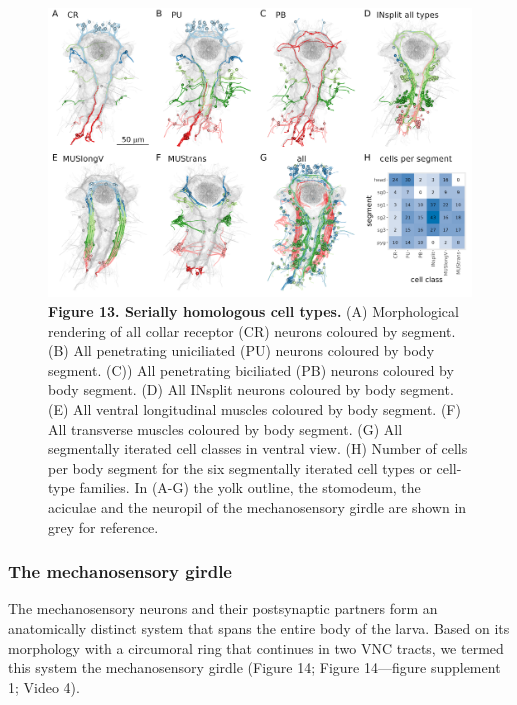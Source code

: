 \documentclass[
  11pt,
]{article}
\begin{document}
\begin{figure}[H]

{\centering \includegraphics[width=1\textwidth,height=\textheight]{Figures/Figure13.png}

}

\caption{\textbf{Figure 13. Serially homologous cell types.} (A)
Morphological rendering of all collar receptor (CR) neurons coloured by
segment. (B) All penetrating uniciliated (PU) neurons coloured by body
segment. (C)) All penetrating biciliated (PB) neurons coloured by body
segment. (D) All INsplit neurons coloured by body segment. (E) All
ventral longitudinal muscles coloured by body segment. (F) All
transverse muscles coloured by body segment. (G) All segmentally
iterated cell classes in ventral view. (H) Number of cells per body
segment for the six segmentally iterated cell types or cell-type
families. In (A-G) the yolk outline, the stomodeum, the aciculae and the
neuropil of the mechanosensory girdle are shown in grey for reference.}

\end{figure}%

\subsubsection{The mechanosensory
girdle}\label{the-mechanosensory-girdle}

The mechanosensory neurons and their postsynaptic partners form an
anatomically distinct system that spans the entire body of the larva.
Based on its morphology with a circumoral ring that continues in two VNC
tracts, we termed this system the mechanosensory girdle (Figure 14;
Figure 14---figure supplement 1; Video 4).
\end{document}
